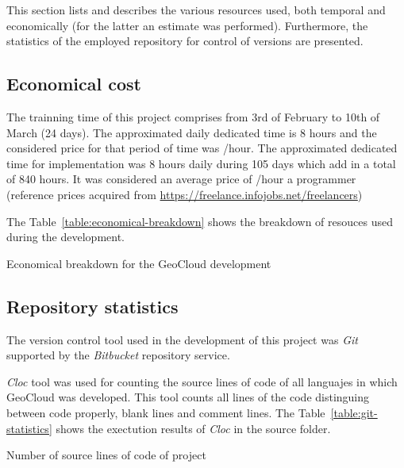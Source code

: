 This section lists and describes the various resources used, both temporal 
and economically (for the latter an estimate was performed). Furthermore, the
statistics of the employed repository for control of versions are presented.

\subsection{Economical cost}

The trainning time of this project comprises from 3rd of February to 10th of
March (24 days). The approximated daily dedicated time is 8 hours and the considered price for that period of time was /hour. The approximated dedicated time for implementation was 8 hours daily
during 105 days which add in a total of 840 hours. It was considered an average
price of /hour a programmer (reference prices acquired from
\url{https://freelance.infojobs.net/freelancers})

The Table~\ref{table:economical-breakdown} shows the breakdown of resouces used during the development.


\begin{table}[hp]
  \centering
  {\small
  
  }
  \caption{Economical breakdown for the GeoCloud development}
  \label{table:economical-breakdown}
\end{table}

\subsection{Repository statistics}

The version control tool used in the development of this project was \emph{Git}
supported by the \emph{Bitbucket} repository service.

\emph{Cloc} tool was used for counting the source lines of code of all languajes in which
GeoCloud was developed. This tool counts all lines of the code distinguing
between code properly, blank lines and comment lines. The Table~\ref{table:git-statistics} shows the
exectution results of \emph{Cloc} in the source folder.

\begin{table}[hp]
  \centering
  {\small
  
  }
  \caption{Number of source lines of code of project}
  \label{table:git-statistics}
\end{table}

